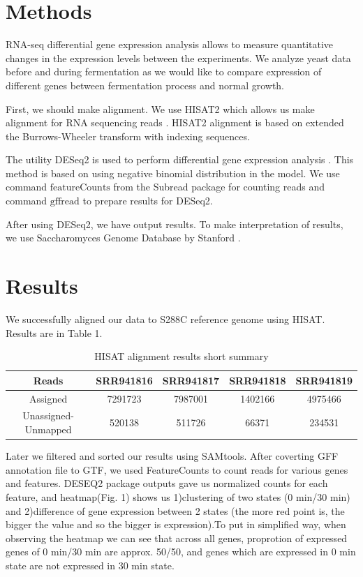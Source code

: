 \documentclass{article}
\begin{document}
\section{Methods}
 RNA-seq differential gene expression analysis allows to measure  quantitative changes in the expression levels between the experiments.  We analyze yeast data before and during fermentation as we would like to compare expression of  different genes between  fermentation process and normal growth. 
 
 First, we should make alignment. We use HISAT2 which allows us make  alignment  for RNA sequencing reads \cite{hisat}. HISAT2 alignment is based on extended the Burrows-Wheeler transform  with indexing sequences. 
 
 The utility DESeq2 is used to perform differential gene expression analysis \cite{deseq}. This method is based on using negative binomial distribution in the model. We use command $\textrm{featureCounts}$ from the Subread package \cite{featurecounts} for counting reads and command $\textrm{gffread}$ \cite{gff} to prepare results for DESeq2. 
 
 After using DESeq2, we have output results. To make interpretation of results, we use Saccharomyces Genome Database  by Stanford \cite{ontology}. 
 
 
 \section{Results}
 
 	We successfully aligned  our data to S288C reference genome using HISAT. Results are in Table 1.
 
 
 	\begin{table} 
 	\centering
 	\begin{tabular}{|c|c|c|c|c|}
 		\hline
 		Reads & SRR941816& SRR941817 & SRR941818 & SRR941819  \\
 		\hline
 	 Assigned	& 7291723&	7987001	&1402166	& 4975466 \\
 		\hline
 		 Unassigned-Unmapped &	520138 & 	511726&	66371	& 234531\\
 		\hline
  
 	\end{tabular}
 	\caption{  HISAT alignment results short summary }
 	\label{tab:2}
 \end{table}
 
 Later we filtered and sorted our results using SAMtools. After coverting GFF annotation file to GTF, we used FeatureCounts to count reads for various genes and features. DESEQ2 package outputs gave us normalized counts for each feature, and heatmap(Fig. 1) shows us 1)clustering of two states (0 min/30 min) and 2)difference of gene expression between 2 states (the more red point is, the bigger the value and so the bigger is expression).To put in simplified way, when observing the heatmap we can see that across all genes, proprotion of expressed genes of 0 min/30 min are approx. 50/50, and genes which are expressed in 0 min state are not expressed in 30 min state. 
 
\end{document}
